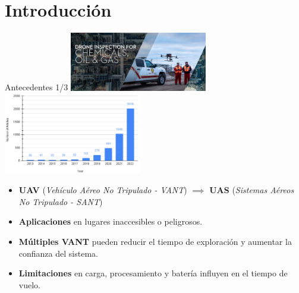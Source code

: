 \documentclass[
  24pt, %
  aspectratio=169, %
]{beamer}
\begin{document}
\section{Introducción}
\begin{frame}{Antecedentes 1/3}
  \bigskip %
  \centering
  \includegraphics[width=0.45\textwidth,height=0.35\textheight]{DJI_B4}
  \hfil
  \includegraphics[width=0.45\textwidth,height=0.35\textheight]{drones-07-00236-g001.png}\footnotemark
  \vspace{2pt}\\
  
  \begin{itemize}
  \item \textbf{UAV} {\tiny(\textit{Vehículo Aéreo No Tripulado - VANT})}  $\implies$ \textbf{UAS} {\tiny(\textit{Sistemas Aéreos No Tripulado - SANT})}
  \item \textbf{Aplicaciones} en lugares inaccesibles o peligrosos.
  \item \textbf{Múltiples VANT} pueden reducir el tiempo de exploración y aumentar la confianza del sistema.
  \item \textbf{Limitaciones} en carga, procesamiento y batería influyen en el tiempo de vuelo.
  \end{itemize}
  
\end{frame}
\end{document}

